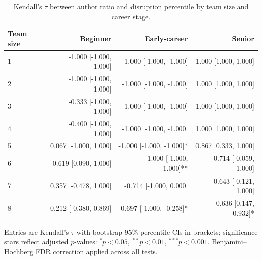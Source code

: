\begin{table}\centering
\caption{Kendall’s $\tau$ between author ratio and disruption percentile by team size and career stage.}
\begin{tabular}{lrrr}
Team size & Beginner & Early-career & Senior \\
\midrule
1 & -1.000 [-1.000, -1.000] & -1.000 [-1.000, -1.000] & 1.000 [1.000, 1.000] \\
2 & -1.000 [-1.000, -1.000] & -1.000 [-1.000, -1.000] & 1.000 [1.000, 1.000] \\
3 & -0.333 [-1.000, 1.000] & -1.000 [-1.000, -1.000] & 1.000 [1.000, 1.000] \\
4 & -0.400 [-1.000, 1.000] & -1.000 [-1.000, -1.000] & 1.000 [1.000, 1.000] \\
5 & 0.067 [-1.000, 1.000] & -1.000 [-1.000, -1.000]* & 0.867 [0.333, 1.000] \\
6 & 0.619 [0.090, 1.000] & -1.000 [-1.000, -1.000]** & 0.714 [-0.059, 1.000] \\
7 & 0.357 [-0.478, 1.000] & -0.714 [-1.000, 0.000] & 0.643 [-0.121, 1.000] \\
8+ & 0.212 [-0.380, 0.869] & -0.697 [-1.000, -0.258]* & 0.636 [0.147, 0.932]* \\
\bottomrule
\end{tabular}
\vspace{0.25em}
\footnotesize{Entries are Kendall's $\tau$ with bootstrap 95\% percentile CIs in brackets; significance stars reflect adjusted $p$-values: $^{*}p<0.05$, $^{**}p<0.01$, $^{***}p<0.001$. Benjamini–Hochberg FDR correction applied across all tests.}
\end{table}
